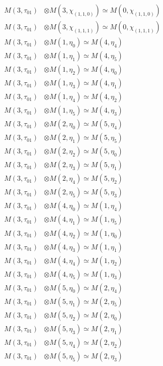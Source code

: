 \begin{align*}
M(3,\tau_{01}) &\otimes M(3,\chi_{(1,1,0)}) \simeq M(0,\chi_{(1,1,0)}) \\
M(3,\tau_{01}) &\otimes M(3,\chi_{(1,1,1)}) \simeq M(0,\chi_{(1,1,1)}) \\
M(3,\tau_{01}) &\otimes M(1,\eta_{0}) \simeq M(4,\eta_{4}) \\
M(3,\tau_{01}) &\otimes M(1,\eta_{1}) \simeq M(4,\eta_{5}) \\
M(3,\tau_{01}) &\otimes M(1,\eta_{2}) \simeq M(4,\eta_{0}) \\
M(3,\tau_{01}) &\otimes M(1,\eta_{3}) \simeq M(4,\eta_{1}) \\
M(3,\tau_{01}) &\otimes M(1,\eta_{4}) \simeq M(4,\eta_{2}) \\
M(3,\tau_{01}) &\otimes M(1,\eta_{5}) \simeq M(4,\eta_{3}) \\
M(3,\tau_{01}) &\otimes M(2,\eta_{0}) \simeq M(5,\eta_{4}) \\
M(3,\tau_{01}) &\otimes M(2,\eta_{1}) \simeq M(5,\eta_{5}) \\
M(3,\tau_{01}) &\otimes M(2,\eta_{2}) \simeq M(5,\eta_{0}) \\
M(3,\tau_{01}) &\otimes M(2,\eta_{3}) \simeq M(5,\eta_{1}) \\
M(3,\tau_{01}) &\otimes M(2,\eta_{4}) \simeq M(5,\eta_{2}) \\
M(3,\tau_{01}) &\otimes M(2,\eta_{5}) \simeq M(5,\eta_{3}) \\
M(3,\tau_{01}) &\otimes M(4,\eta_{0}) \simeq M(1,\eta_{4}) \\
M(3,\tau_{01}) &\otimes M(4,\eta_{1}) \simeq M(1,\eta_{5}) \\
M(3,\tau_{01}) &\otimes M(4,\eta_{2}) \simeq M(1,\eta_{0}) \\
M(3,\tau_{01}) &\otimes M(4,\eta_{3}) \simeq M(1,\eta_{1}) \\
M(3,\tau_{01}) &\otimes M(4,\eta_{4}) \simeq M(1,\eta_{2}) \\
M(3,\tau_{01}) &\otimes M(4,\eta_{5}) \simeq M(1,\eta_{3}) \\
M(3,\tau_{01}) &\otimes M(5,\eta_{0}) \simeq M(2,\eta_{4}) \\
M(3,\tau_{01}) &\otimes M(5,\eta_{1}) \simeq M(2,\eta_{5}) \\
M(3,\tau_{01}) &\otimes M(5,\eta_{2}) \simeq M(2,\eta_{0}) \\
M(3,\tau_{01}) &\otimes M(5,\eta_{3}) \simeq M(2,\eta_{1}) \\
M(3,\tau_{01}) &\otimes M(5,\eta_{4}) \simeq M(2,\eta_{2}) \\
M(3,\tau_{01}) &\otimes M(5,\eta_{5}) \simeq M(2,\eta_{3}) \\
\end{align*}

